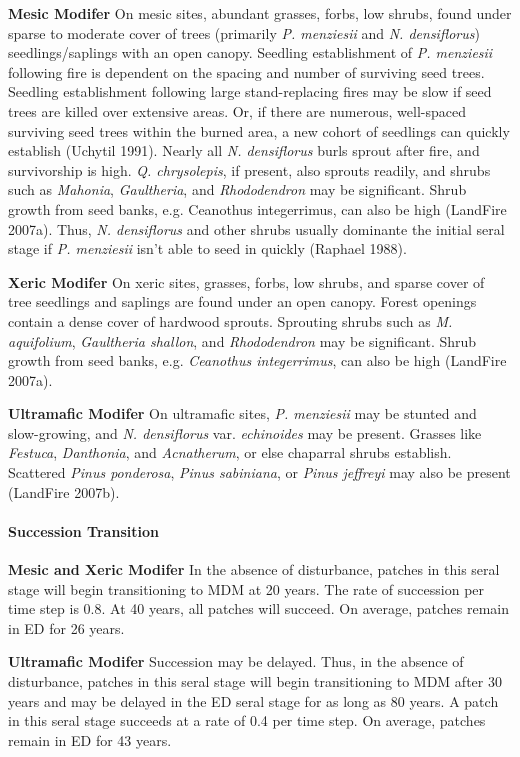 \begin{adjustwidth}{2cm}{}
\textbf{Mesic Modifer } On mesic sites, abundant grasses, forbs, low shrubs, found under sparse to moderate cover of trees (primarily \emph{P. menziesii} and \emph{N. densiflorus}) seedlings/saplings with an open canopy. Seedling establishment of \emph{P. menziesii} following fire is dependent on the spacing and number of surviving seed trees. Seedling establishment following large stand-replacing fires may be slow if seed trees are killed over extensive areas. Or, if there are numerous, well-spaced surviving seed trees within the burned area, a new cohort of seedlings can quickly establish (Uchytil 1991). Nearly all \emph{N. densiflorus} burls sprout after fire, and survivorship is high. \emph{Q. chrysolepis}, if present, also sprouts readily, and shrubs such as \emph{Mahonia}, \emph{Gaultheria}, and \emph{Rhododendron} may be significant. Shrub growth from seed banks, e.g. Ceanothus integerrimus, can also be high (LandFire 2007a). Thus, \emph{N. densiflorus} and other shrubs usually dominante the initial seral stage if \emph{P. menziesii} isn’t able to seed in quickly (Raphael 1988).

\medskip
\noindent \textbf{Xeric Modifer}  On xeric sites, grasses, forbs, low shrubs, and sparse cover of tree seedlings and saplings are found under an open canopy. Forest openings contain a dense cover of hardwood sprouts. Sprouting shrubs such as \emph{M. aquifolium}, \emph{Gaultheria shallon}, and \emph{Rhododendron} may be significant. Shrub growth from seed banks, e.g. \emph{Ceanothus integerrimus}, can also be high (LandFire 2007a). 


\medskip
\noindent \textbf{Ultramafic Modifer}  On ultramafic sites, \emph{P. menziesii} may be stunted and slow-growing, and \emph{N. densiflorus} var. \emph{echinoides} may be present. Grasses like \emph{Festuca}, \emph{Danthonia}, and \emph{Acnatherum}, or else chaparral shrubs establish. Scattered \emph{Pinus ponderosa}, \emph{Pinus sabiniana}, or \emph{Pinus jeffreyi} may also be present (LandFire 2007b).

\end{adjustwidth}

\paragraph{Succession Transition}
\begin{adjustwidth}{2cm}{}
\textbf{Mesic and Xeric Modifer } In the absence of disturbance, patches in this seral stage will begin transitioning to MDM at 20 years. The rate of succession per time step is 0.8. At 40 years, all patches will succeed. On average, patches remain in ED for 26 years.


\medskip
\noindent \textbf{Ultramafic Modifer} Succession may be delayed. Thus, in the absence of disturbance, patches in this seral stage will begin transitioning to MDM after 30 years and may be delayed in the ED seral stage for as long as 80 years. A patch in this seral stage succeeds at a rate of 0.4 per time step. On average, patches remain in ED for 43 years.

\end{adjustwidth}

